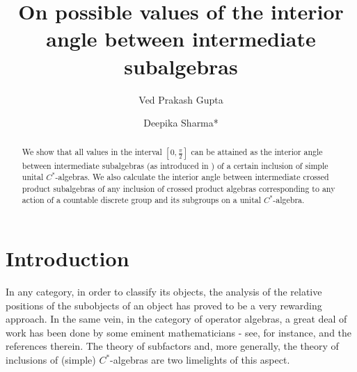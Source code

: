 \documentclass[a4]{amsart}
\numberwithin{equation}{section}
\begin{document}
\title[Possible values of the interior angle]{On possible values of
  the interior angle between intermediate subalgebras}

\author[V P Gupta]{Ved Prakash Gupta}
\author[D Sharma]{Deepika Sharma*}

\address{School of Physical Sciences, Jawaharlal Nehru University, New Delhi, INDIA}




\date{}

\begin{abstract}
We show that all values in the interval $[0,\frac{\pi}{2}]$ can be
attained as the interior angle  between
intermediate subalgebras (as introduced in \cite{BG2}) of a certain inclusion of simple unital
$C^*$-algebras. We also calculate the interior  angle between
intermediate crossed product subalgebras of any inclusion of crossed
product algebras corresponding  to any action  of a countable discrete
group and its subgroups on a  unital $C^*$-algebra.
  \end{abstract}

\maketitle

\section{Introduction}
In any category, in order to classify its objects, the analysis of the
relative positions of the subobjects of an object has proved to be a
very rewarding approach. In the same vein, in the category of operator
algebras, a great deal of work has been done by some eminent
mathematicians - see, for instance, \cite{BDLR, BG2, Izumi, IW, JS,
  Wat} and the references therein. The theory of subfactors and, more
generally, the theory of inclusions of (simple) $C^*$-algebras are two
limelights of this aspect.
\end{document}
